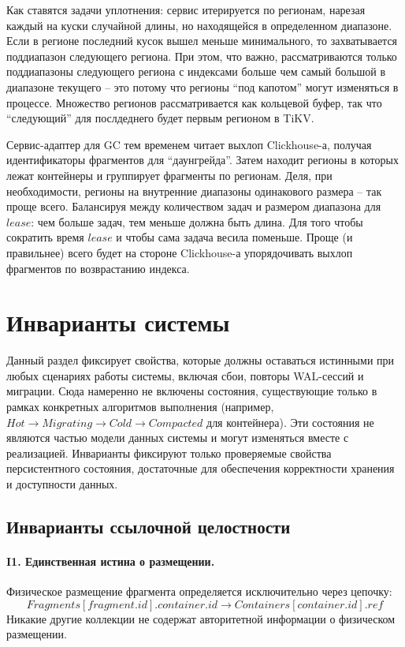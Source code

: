 \documentclass[a4paper,12pt]{article}
\begin{document}
    Как ставятся задачи уплотнения: сервис итерируется по регионам, нарезая каждый на куски случайной длины, но находящейся в определенном диапазоне. Если в регионе последний кусок вышел
    меньше минимального, то захватывается поддиапазон следующего региона. При этом, что важно, рассматриваются только поддиапазоны следующего региона с индексами больше чем самый
    большой в диапазоне текущего – это потому что регионы \enquote{под капотом} могут изменяться в процессе. Множество регионов рассматривается как кольцевой буфер, так что \enquote{следующий}
    для послдеднего будет первым регионом в TiKV.

    Сервис-адаптер для GC тем временем читает выхлоп Clickhouse-а, получая идентификаторы фрагментов для \enquote{даунгрейда}. Затем находит регионы в которых лежат контейнеры
    и группирует фрагменты по регионам. Деля, при необходимости, регионы на внутренние диапазоны одинакового размера – так проще всего. Балансируя между количеством задач и размером
    диапазона для $lease$: чем больше задач, тем меньше должна быть длина. Для того чтобы сократить время $lease$ и чтобы сама задача весила поменьше. Проще (и правильнее) всего будет
    на стороне Clickhouse-а упорядочивать выхлоп фрагментов по возврастанию индекса.

    \newpage


    \section{Инварианты системы}

    Данный раздел фиксирует свойства, которые должны оставаться истинными при любых
    сценариях работы системы, включая сбои, повторы WAL-сессий и миграции. Сюда намеренно не включены состояния, существующие
    только в рамках конкретных алгоритмов выполнения (например, $Hot \rightarrow Migrating \rightarrow Cold \rightarrow Compacted$ для контейнера).
    Эти состояния не являются частью модели данных системы и могут изменяться вместе с реализацией.
    Инварианты фиксируют только проверяемые свойства персистентного состояния, достаточные для обеспечения корректности хранения и доступности данных.

    \subsection{Инварианты ссылочной целостности}

    \paragraph{I1. Единственная истина о размещении.}
    Физическое размещение фрагмента определяется исключительно через цепочку:
    \[
        Fragments[fragment.id].container.id \rightarrow Containers[container.id].ref
    \]
    Никакие другие коллекции не содержат авторитетной информации о физическом размещении.
\end{document}
